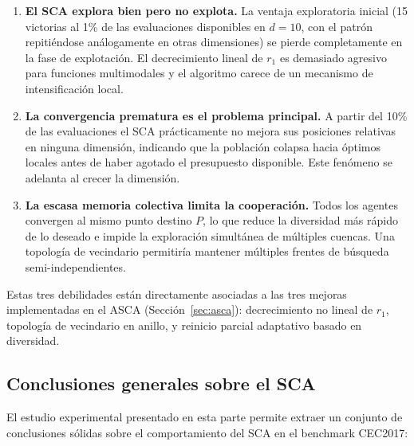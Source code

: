 \documentclass[12pt,a4paper]{article}
\begin{document}
\begin{enumerate}
    \item \textbf{El SCA explora bien pero no explota.} La ventaja exploratoria inicial (15 victorias al 1\% de las evaluaciones disponibles en $d=10$, con el patrón repitiéndose análogamente en otras dimensiones) se pierde completamente en la fase de explotación. El decrecimiento lineal de $r_1$ es demasiado agresivo para funciones multimodales y el algoritmo carece de un mecanismo de intensificación local.

    \item \textbf{La convergencia prematura es el problema principal.} A partir del 10\% de las evaluaciones el SCA prácticamente no mejora sus posiciones relativas en ninguna dimensión, indicando que la población colapsa hacia óptimos locales antes de haber agotado el presupuesto disponible. Este fenómeno se adelanta al crecer la dimensión.

    \item \textbf{La escasa memoria colectiva limita la cooperación.} Todos los agentes convergen al mismo punto destino $P$, lo que reduce la diversidad más rápido de lo deseado e impide la exploración simultánea de múltiples cuencas. Una topología de vecindario permitiría mantener múltiples frentes de búsqueda semi-independientes.
\end{enumerate}

Estas tres debilidades están directamente asociadas a las tres mejoras implementadas en el ASCA (Sección~\ref{sec:asca}): decrecimiento no lineal de $r_1$, topología de vecindario en anillo, y reinicio parcial adaptativo basado en diversidad.

\subsection{Conclusiones generales sobre el SCA}
\label{sec:conclusiones_sca}

El estudio experimental presentado en esta parte permite extraer un conjunto de conclusiones sólidas sobre el comportamiento del SCA en el benchmark CEC2017:
\end{document}
